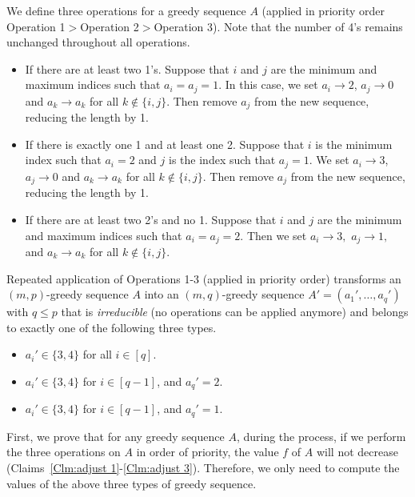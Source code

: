 \documentclass[11pt,a4paper]{article}
\begin{document}
We define three operations for a greedy sequence $A$
(applied in priority order Operation 1$>$Operation 2$>$Operation 3).
Note that the number of 4's remains unchanged throughout all operations.
\begin{itemize}[leftmargin=22mm]
    \setlength\itemsep{0em}
	\item [Operation 1.] 
      If there are at least two 1's. 
      Suppose that $i$ and $j$ are the minimum and maximum indices such that $a_i=a_j=1.$ 
	 In this case, we set $a_i \to 2$, $a_j \to 0$ and $a_k \to a_k$ 
      for all $k\notin\{i,j\}$. 
      Then remove $a_j$ from the new sequence, reducing the length by 1.
	\item [Operation 2.] 
      If there is exactly one 1 and at least one 2. 
      Suppose that $i$ is the minimum index such that $a_i=2$ and $j$ is the index such that $a_j=1.$
      We set $a_i \to 3$, $a_j \to 0$ and $a_k \to a_k$ 
      for all $k\notin\{i,j\}$.  
      Then remove $a_j$ from the new sequence, reducing the length by 1.
	\item [Operation 3.] 
      If there are at least two 2's and no 1. 
      Suppose that $i$ and $j$ are the minimum and maximum indices such that $a_i=a_j=2.$ 
	 Then we set $a_i \to 3,$ $a_j \to 1,$ and $a_k \to a_k$ for all 
      $k\notin\{i,j\}.$
\end{itemize}
Repeated application of Operations 1-3 (applied in priority order) transforms an $(m,p)$-greedy sequence $A$ into an $(m,q)$-greedy sequence $A' = (a_1', \dots, a_q')$ with $q \leq p$ that is \textit{irreducible} (no operations can be applied anymore) and belongs to exactly one of the following three types. 
\begin{itemize}[leftmargin=22mm]
\setlength\itemsep{0em}
\item[\textbf{Type 1:}] $a_i' \in \{3,4\}$ for all $i \in [q].$ 
\item[\textbf{Type 2:}] $a_i' \in \{3,4\}$ for $i \in [q-1]$, and $a_q' = 2.$
\item[\textbf{Type 3:}] $a_i' \in \{3,4\}$ for $i \in [q-1]$, and $a_q' = 1.$
\end{itemize}

First, we prove that for any greedy sequence $A$,
during the process, if we perform the three operations on $A$ in order of priority, the value $f$ of $A$ will not decrease (Claims~\ref{Clm:adjust 1}-\ref{Clm:adjust 3}).
Therefore, we only need to compute the values of the above three types of greedy sequence. 
\end{document}
